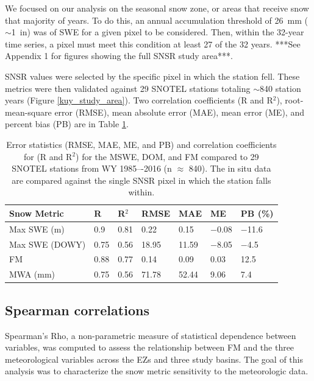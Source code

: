 We focused on our analysis on the seasonal snow zone, or areas that receive snow that majority of years. To do this, an annual accumulation threshold of 26~mm ($\sim$1~in) was of SWE for a given pixel to be considered. Then, within the 32-year time series, a pixel must meet this condition at least 27 of the 32 years. ***See Appendix 1 for figures showing the full SNSR study area***. 

SNSR values were selected by the specific pixel in which the station fell. These metrics were then validated against 29 SNOTEL stations totaling $\sim$840 station years (Figure \ref{kuy_study_area}). Two correlation coefficients (R and R$^{2}$), root-mean-square error (RMSE), mean absolute error (MAE), mean error (ME), and percent bias (PB) are in Table \ref{tab:snow_metrics_val_table}.

\begin{table}[htbp]
  \centering
  \caption{Error statistics (RMSE, MAE, ME, and PB) and correlation coefficients for (R and R$^{2}$) for the MSWE, DOM, and FM compared to 29 SNOTEL stations from WY 1985–-2016 (n $\approx$ 840). The in situ data are compared against the single SNSR pixel in which the station falls within.}
  \label{tab:snow_metrics_val_table}
  \begin{tabular}{lllllll}
    \toprule
    Snow Metric & R & R$^{2}$ & RMSE & MAE & ME & PB (\%) \\
    \midrule
    Max SWE (m) & 0.9 & 0.81 & 0.22 & 0.15 & $-$0.08 & $-$11.6 \\
    Max SWE (DOWY) & 0.75 & 0.56 & 18.95 & 11.59 & $-$8.05 & $-$4.5 \\
    FM & 0.88 & 0.77 & 0.14 & 0.09 & 0.03 & 12.5 \\
    MWA (mm) & 0.75 & 0.56 & 71.78 & 52.44 & 9.06 & 7.4 \\
    \bottomrule
  \end{tabular}
\end{table}

\hypertarget{ch2-methods-2}{\subsection{Spearman correlations}\label{ch2-methods-2}}

Spearman's Rho, a non-parametric measure of statistical dependence between variables, was computed to assess the relationship between FM and the three meteorological variables across the EZs and three study basins. The goal of this analysis was to characterize the snow metric sensitivity to the meteorologic data.

